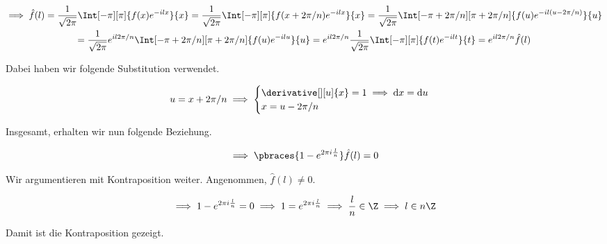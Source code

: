 \begin{solution}
\begin{multline*}
    \implies
    \hat f(l)
    =
    \frac{1}{\sqrt{2 \pi}}
    \Int[-\pi][\pi]
    {
        f(x)
        e^{-i l x}
    }{x}
    =
    \frac{1}{\sqrt{2 \pi}}
    \Int[-\pi][\pi]
    {
        f(x + 2 \pi / n)
        e^{-i l x}
    }{x}
    =
    \frac{1}{\sqrt{2 \pi}}
    \Int[-\pi + 2 \pi / n][\pi + 2 \pi / n]
    {
        f(u)
        e^{-i l (u - 2 \pi / n)}
    }{u} \\
    =
    \frac{1}{\sqrt{2 \pi}}
    e^{i l 2 \pi / n}
    \Int[-\pi + 2 \pi / n][\pi + 2 \pi / n]
    {
        f(u)
        e^{-i l u}
    }{u}
    =
    e^{i l 2 \pi / n}
    \frac{1}{\sqrt{2 \pi}}
    \Int[-\pi][\pi]
    {
        f(t)
        e^{-i l t}
    }{t}
    =
    e^{i l 2 \pi / n}
    \hat f(l)
\end{multline*}

Dabei haben wir folgende Substitution verwendet.

\begin{align*}
    u = x + 2 \pi / n
    \implies
    \begin{cases}
        \derivative[][u]{x} = 1 \implies \mathrm{d} x = \mathrm{d} u \\
        x = u - 2 \pi / n
    \end{cases}
\end{align*}

Insgesamt, erhalten wir nun folgende Beziehung.

\begin{align*}
    \implies
    \pbraces{1 - e^{2 \pi i \frac{l}{n}}} \hat f(l) = 0
\end{align*}

Wir argumentieren mit Kontraposition weiter.
Angenommen, $\hat f(l) \neq 0$.

\begin{align*}
    \implies
    1 - e^{2 \pi i \frac{l}{n}} = 0
    \implies
    1 = e^{2 \pi i \frac{l}{n}}
    \implies
    \frac{l}{n} \in \Z
    \implies
    l \in n \Z
\end{align*}

Damit ist die Kontraposition gezeigt.

\end{solution}

